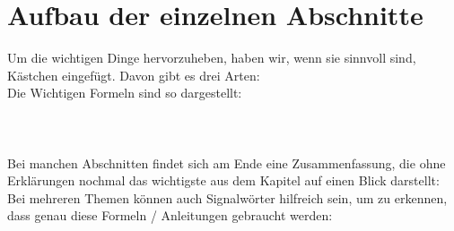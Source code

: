 	\section*{Aufbau der einzelnen Abschnitte}
		Um die wichtigen Dinge hervorzuheben, haben wir, wenn sie sinnvoll sind,
		Kästchen eingefügt.
		Davon gibt es drei Arten:\\
		Die Wichtigen Formeln sind so dargestellt:
		\\ \\
		\formel{\[ e^{i\phi}+1=0 \]}
		\\ \\
		Bei manchen Abschnitten findet sich am Ende eine Zusammenfassung, die ohne
		Erklärungen nochmal das wichtigste aus dem Kapitel auf einen Blick darstellt:
		Bei mehreren Themen können auch Signalwörter hilfreich sein, um zu
		erkennen, dass genau diese Formeln / Anleitungen gebraucht werden:
